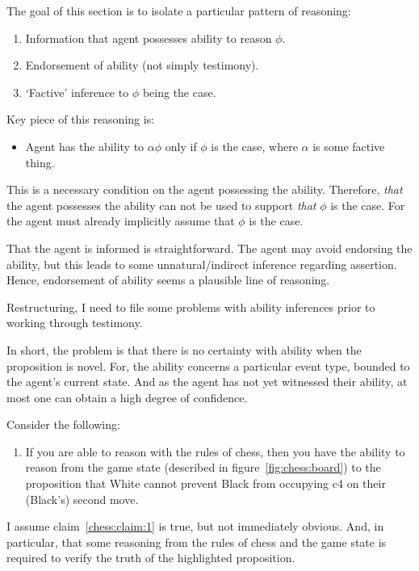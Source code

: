 \documentclass[10pt]{article}
\begin{document}
\begin{note}
  The goal of this section is to isolate a particular pattern of reasoning:
  \begin{enumerate}
  \item Information that agent possesses ability to reason \(\phi\).
  \item Endorsement of ability (not simply testimony).
  \item `Factive' inference to \(\phi\) being the case.
  \end{enumerate}
  Key piece of this reasoning is:
  \begin{itemize}
  \item Agent has the ability to \(\alpha\phi\) only if \(\phi\) is the case, where \(\alpha\) is some factive thing.
  \end{itemize}
  This is a necessary condition on the agent possessing the ability.
  Therefore, \emph{that} the agent possesses the ability can not be used to support \emph{that} \(\phi\) is the case.
  For the agent must already implicitly assume that \(\phi\) is the case.

  That the agent is informed is straightforward.
  The agent may avoid endorsing the ability, but this leads to some unnatural/indirect inference regarding assertion.
  Hence, endorsement of ability seems a plausible line of reasoning.

  Restructuring, I need to file some problems with ability inferences prior to working through testimony.

  In short, the problem is that there is no certainty with ability when the proposition is novel.
  For, the ability concerns a particular event type, bounded to the agent's current state.
  And as the agent has not yet witnessed their ability, at most one can obtain a high degree of confidence.
\end{note}

Consider the following:
\begin{enumerate}
\item\label{chess:claim:1}\label{chess:claim:1:conditional} If you are able to reason with the rules of chess, then you have the ability to reason from the game state (described in figure~\ref{fig:chess:board}) to the proposition that White cannot prevent Black from occupying c4 on their (Black's) second move.
\end{enumerate}

I assume claim~\ref{chess:claim:1} is true, but not immediately obvious.
And, in particular, that some reasoning from the rules of chess and the game state is required to verify the truth of the highlighted proposition.
\end{document}
